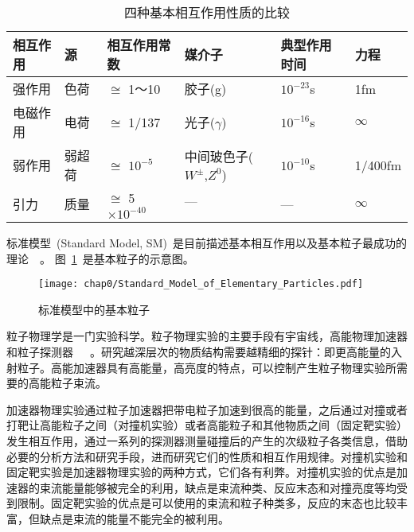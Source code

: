 \begin{table}[h]
    \centering
    \caption{\label{tbl:interaction} 四种基本相互作用性质的比较}
    \footnotesize
    \begin{tabular}{llllll}
        \hline
        相互作用& 源&     相互作用常数&                   媒介子&                            典型作用时间&   力程 \\
        \hline
        强作用&   色荷&   $\cong$ 1～10&                 胶子(g)&                           $10^{-23}$s&    1fm \\
        电磁作用& 电荷&   $\cong$ 1/137&                 光子($\gamma$)&                    $10^{-16}$s&    $\infty$\\
        弱作用&   弱超荷& $\cong$ $10^{-5}$&             中间玻色子($W^{\pm}$,$Z^{0}$)&      $10^{-10}$s&   1/400fm \\
        引力&     质量&   $\cong$ 5$\times 10^{-40}$&    $\text{---}$&                      ---&           $\infty$\\
        \hline
    \end{tabular}
\end{table}

标准模型~(Standard Model, SM)~是目前描述基本相互作用以及基本粒子最成功的理论~\cite{duds2015}~\cite{S.Weinberg:1967}。
图~\ref{fig:standard_model_particle}~是基本粒子的示意图。
\begin{figure}[!h]
  \centering
  \texttt{[image: chap0/Standard\_Model\_of\_Elementary\_Particles.pdf]}
  \caption{标准模型中的基本粒子}
  \label{fig:standard_model_particle}
\end{figure}

粒子物理学是一门实验科学。粒子物理实验的主要手段有宇宙线，高能物理加速器和粒子探测器~\cite{tangxw1982}~\cite{xukz1981}~\cite{xieyg2003}\cite{xuefj2003}。研究越深层次的物质结构需要越精细的探针：即更高能量的入射粒子。高能加速器具有高能量，高亮度的特点，可以控制产生粒子物理实验所需要的高能粒子束流。

加速器物理实验通过粒子加速器把带电粒子加速到很高的能量，之后通过对撞或者打靶让高能粒子之间（对撞机实验）或者高能粒子和其他物质之间（固定靶实验）发生相互作用，通过一系列的探测器测量碰撞后的产生的次级粒子各类信息，借助必要的分析方法和研究手段，进而研究它们的性质和相互作用规律。对撞机实验和固定靶实验是加速器物理实验的两种方式，它们各有利弊。对撞机实验的优点是加速器的束流能量能够被完全的利用，缺点是束流种类、反应末态和对撞亮度等均受到限制。固定靶实验的优点是可以使用的束流和粒子种类多，反应的末态也比较丰富，但缺点是束流的能量不能完全的被利用。

